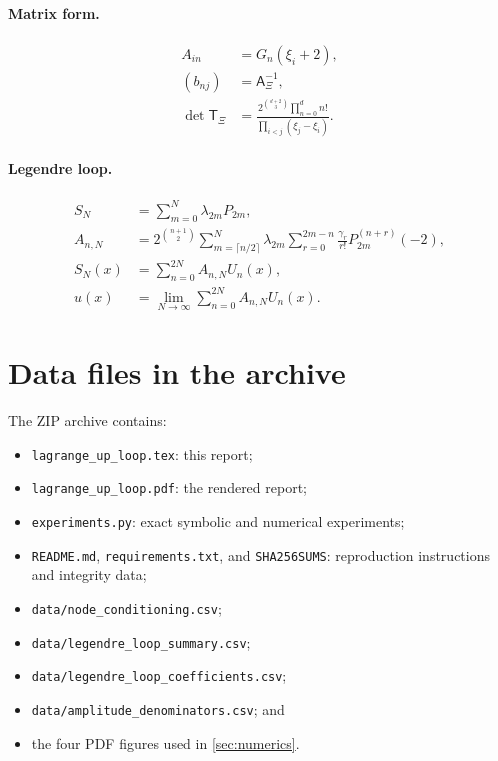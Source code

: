 \documentclass[11pt,oneside]{article}
\theoremstyle{definition}
\theoremstyle{remark}
\begin{document}
\paragraph{Matrix form.}
\begin{align*}
 A_{in}&=G_n(\xi_i+2),\\
 (b_{nj})&=\mathsf A_\Xi^{-1},\\
 \det\mathsf T_\Xi&=
 \frac{2^{\binom{d+2}{3}}\prod_{n=0}^{d}n!}
 {\prod_{i<j}(\xi_j-\xi_i)}.
\end{align*}

\paragraph{Legendre loop.}
\begin{align*}
 S_N&=\sum_{m=0}^{N}\lambda_{2m}P_{2m},\\
 A_{n,N}&=2^{\binom{n+1}{2}}
 \sum_{m=\lceil n/2\rceil}^{N}\lambda_{2m}
 \sum_{r=0}^{2m-n}\frac{\gamma_r}{r!}P_{2m}^{(n+r)}(-2),\\
 S_N(x)&=\sum_{n=0}^{2N}A_{n,N}U_n(x),\\
 u(x)&=\lim_{N\to\infty}\sum_{n=0}^{2N}A_{n,N}U_n(x).
\end{align*}

\section{Data files in the archive}
The ZIP archive contains:

\begin{itemize}
\item \texttt{lagrange\_up\_loop.tex}: this report;
\item \texttt{lagrange\_up\_loop.pdf}: the rendered report;
\item \texttt{experiments.py}: exact symbolic and numerical experiments;
\item \texttt{README.md}, \texttt{requirements.txt}, and
\texttt{SHA256SUMS}: reproduction instructions and integrity data;
\item \texttt{data/node\_conditioning.csv};
\item \texttt{data/legendre\_loop\_summary.csv};
\item \texttt{data/legendre\_loop\_coefficients.csv};
\item \texttt{data/amplitude\_denominators.csv}; and
\item the four PDF figures used in \cref{sec:numerics}.
\end{itemize}
\end{document}
